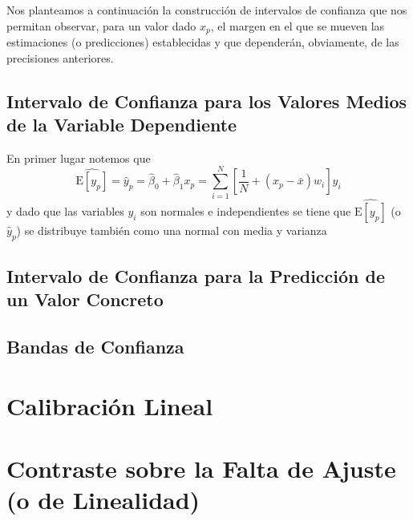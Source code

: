 \documentclass[10pt,a4paper]{book}
\begin{document}
Nos planteamos a continuación la construcción de intervalos de confianza que nos permitan observar, para un valor dado $x_p$, el margen en el que se mueven las estimaciones (o predicciones) establecidas y que dependerán, obviamente, de las precisiones anteriores.
		\subsection{Intervalo de Confianza para los Valores Medios de la Variable Dependiente}
En primer lugar notemos que
$$\widehat{\mathrm{E}[y_p]}=\widehat{y}_p=\widehat{\beta}_0+\widehat{\beta}_1x_p=\sum^N_{i=1}\left[\dfrac{1}{N}+(x_p-\bar{x})w_i\right]y_i$$
y dado que las variables $y_i$ son normales e independientes se tiene que $\widehat{\mathrm{E}[y_p]}$ (o $\widehat{y}_p$) se distribuye también como una normal con media y varianza
		\subsection{Intervalo de Confianza para la Predicción de un Valor Concreto}
		\subsection{Bandas de Confianza}
	\section{Calibración Lineal}
	\section{Contraste sobre la Falta de Ajuste (o de Linealidad)}
\end{document}
